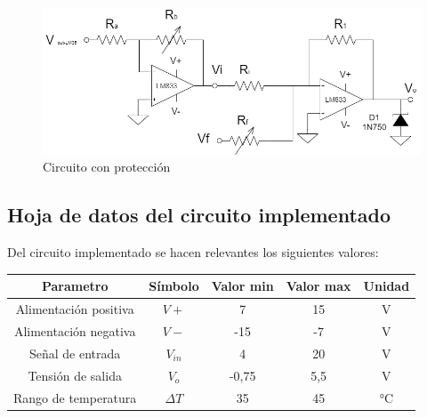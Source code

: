 \begin{figure}[H]
    \centering
    \includegraphics[scale=0.5]{../Ejercicio4-CircuitodeAplicacion/CircProteccion.png}
    \caption{Circuito con protección}
\end{figure}


\subsection{Hoja de datos del circuito implementado}

Del circuito implementado se hacen relevantes los siguientes valores:

\begin{table}[H]
\centering
\begin{tabular}{|c|c|c|c|c|}
\hline
\textbf{Parametro}    & \textbf{Símbolo}        & \textbf{Valor min} & \textbf{Valor max} & \textbf{Unidad} \\ \hline
Alimentación positiva & $V+$                      & 7                  & 15                 & V               \\ \hline
Alimentación negativa & $V-$                      & -15                & -7                 & V               \\ \hline
Señal de entrada      & $V_{in}$               & 4                  & 20                 & V               \\ \hline
Tensión de salida     & $V_{o}$                & -0,75              & 5,5                & V               \\ \hline
Rango de temperatura  & $\Delta T$ & 35                 & 45                 & °C              \\ \hline
\end{tabular}
\end{table}





